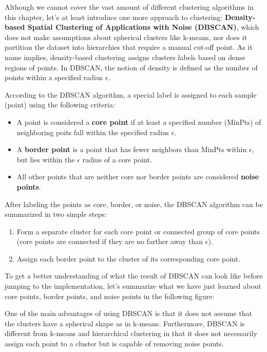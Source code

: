 \documentclass[11pt]{article}
\providecommand{\tightlist}{%
      \setlength{\itemsep}{0pt}\setlength{\parskip}{0pt}}
\begin{document}
    Although we cannot cover the vast amount of different clustering
algorithms in this chapter, let's at least introduce one more approach
to clustering: \textbf{Density-based Spatial Clustering of Applications
with Noise (DBSCAN)}, which does not make assumptions about spherical
clusters like k-means, nor does it partition the dataset into
hierarchies that require a manual cut-off point. As it name implies,
density-based clustering assigns clusters labels based on dense regions
of points. In DBSCAN, the notion of density is defined as the number of
points within a specified radius \(\epsilon\).

According to the DBSCAN algorithm, a special label is assigned to each
sample (point) using the following criteria:

\begin{itemize}
\tightlist
\item
  A point is considered a \textbf{core point} if at least a specified
  number (MinPts) of neighboring poits fall within the specified radius
  \(\epsilon\).
\item
  A \textbf{border point} is a point that has fewer neighbors than
  MinPts within \(\epsilon\), but lies within the \(\epsilon\) radius of
  a core point.
\item
  All other points that are neither core nor border points are
  considered \textbf{noise points}.
\end{itemize}

After labeling the points as core, border, or noise, the DBSCAN
algorithm can be summarized in two simple steps:

\begin{enumerate}
\def\labelenumi{\arabic{enumi}.}
\tightlist
\item
  Form a separate cluster for each core point or connected group of core
  points (core points are connected if they are no farther away than
  \(\epsilon\)).
\item
  Assign each border point to the cluster of its corresponding core
  point.
\end{enumerate}

To get a better understanding of what the result of DBSCAN can look like
before jumping to the implementation, let's summarize what we have just
learned about core points, border points, and noise points in the
following figure:

    One of the main advantages of using DBSCAN is that it does not assume
that the clusters have a spherical shape as in k-means. Furthermore,
DBSCAN is different from k-means and hierarchical clustering in that it
does not necessarily assign each point to a cluster but is capable of
removing noise points.
\end{document}
